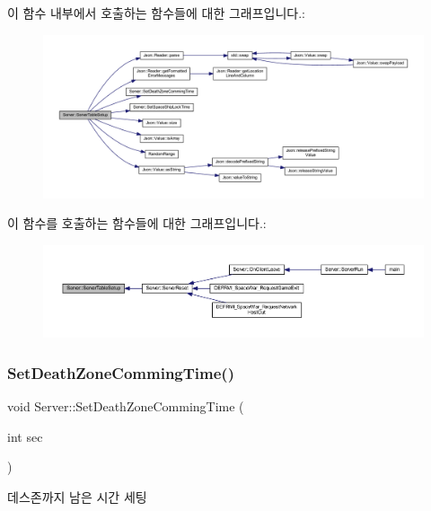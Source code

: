 이 함수 내부에서 호출하는 함수들에 대한 그래프입니다.\+:
\nopagebreak
\begin{figure}[H]
\begin{center}
\leavevmode
\includegraphics[width=350pt]{class_server_a2ea82221dd5edd72b97a465a9753a68e_cgraph}
\end{center}
\end{figure}
이 함수를 호출하는 함수들에 대한 그래프입니다.\+:\nopagebreak
\begin{figure}[H]
\begin{center}
\leavevmode
\includegraphics[width=350pt]{class_server_a2ea82221dd5edd72b97a465a9753a68e_icgraph}
\end{center}
\end{figure}
\mbox{\label{class_server_a0c817a017f9b2cb6f92de01e693b8e35}} 
\subsubsection{\texorpdfstring{Set\+Death\+Zone\+Comming\+Time()}{SetDeathZoneCommingTime()}}
{\footnotesize\ttfamily void Server\+::\+Set\+Death\+Zone\+Comming\+Time (\begin{DoxyParamCaption}\item[{int}]{sec }\end{DoxyParamCaption})}



데스존까지 남은 시간 세팅 

